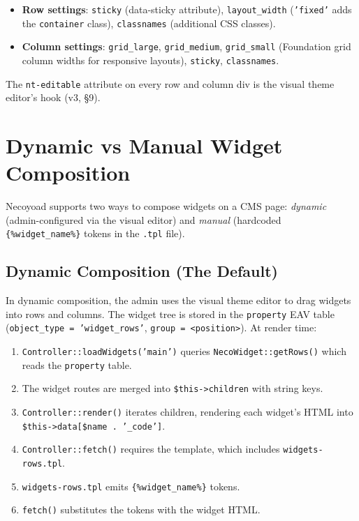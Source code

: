 \documentclass[11pt,a4paper]{article}
\begin{document}
\begin{itemize}[leftmargin=1.6em,itemsep=2pt]
  \item \textbf{Row settings}: \texttt{sticky} (data-sticky attribute),
        \texttt{layout\_width} (\texttt{'fixed'} adds the
        \texttt{container} class), \texttt{classnames} (additional CSS
        classes).
  \item \textbf{Column settings}: \texttt{grid\_large},
        \texttt{grid\_medium}, \texttt{grid\_small} (Foundation grid
        column widths for responsive layouts), \texttt{sticky},
        \texttt{classnames}.
\end{itemize}

The \texttt{nt-editable} attribute on every row and column div is the
visual theme editor's hook (v3, \S9).

\section{Dynamic vs Manual Widget Composition}\label{sec:composition-modes}

Necoyoad supports two ways to compose widgets on a CMS page:
\emph{dynamic} (admin-configured via the visual editor) and \emph{manual}
(hardcoded \texttt{\{\%widget\_name\%\}} tokens in the \texttt{.tpl} file).

\subsection{Dynamic Composition (The Default)}

In dynamic composition, the admin uses the visual theme editor to drag
widgets into rows and columns. The widget tree is stored in the
\texttt{property} EAV table (\texttt{object\_type = 'widget\_rows'},
\texttt{group = <position>}). At render time:

\begin{enumerate}[leftmargin=1.6em,itemsep=2pt]
  \item \texttt{Controller::loadWidgets('main')} queries
        \texttt{NecoWidget::getRows()} which reads the
        \texttt{property} table.
  \item The widget routes are merged into \texttt{\$this->children} with
        string keys.
  \item \texttt{Controller::render()} iterates children, rendering each
        widget's HTML into \texttt{\$this->data[\$name . '\_code']}.
  \item \texttt{Controller::fetch()} requires the template, which
        includes \texttt{widgets-rows.tpl}.
  \item \texttt{widgets-rows.tpl} emits
        \texttt{\{\%widget\_name\%\}} tokens.
  \item \texttt{fetch()} substitutes the tokens with the widget HTML.
\end{enumerate}
\end{document}
